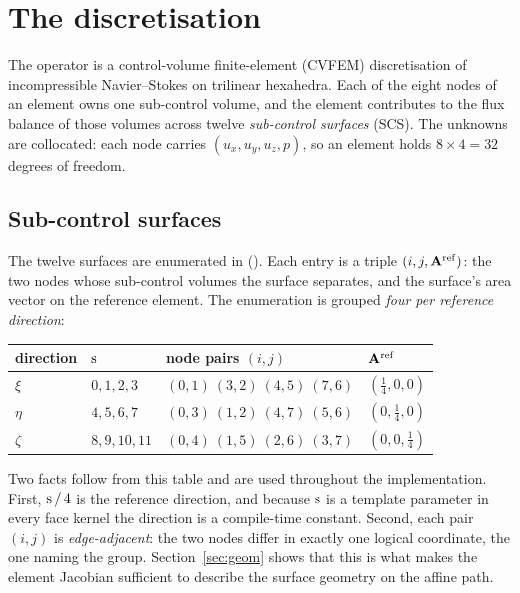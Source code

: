 \section{The discretisation}
\label{sec:disc}

The operator is a control-volume finite-element (CVFEM) discretisation of incompressible
Navier--Stokes on trilinear hexahedra. Each of the eight nodes of an element owns one
sub-control volume, and the element contributes to the flux balance of those volumes across
twelve \emph{sub-control surfaces} (SCS). The unknowns are collocated: each node carries
$(u_x,u_y,u_z,p)$, so an element holds $8\times 4 = 32$ degrees of freedom.

\subsection{Sub-control surfaces}

The twelve surfaces are enumerated in 
(). Each entry is a triple
$(i, j, \mathbf{A}^{\mathrm{ref}})$: the two nodes whose sub-control volumes the surface separates,
and the surface's area vector on the reference element. The enumeration is grouped
\emph{four per reference direction}:

\begin{center}
\begin{tabular}{@{}llll@{}}
\toprule
direction & $\mathrm{s}$ & node pairs $(i,j)$ & $\mathbf{A}^{\mathrm{ref}}$ \\
\midrule
$\xi$   & $0,1,2,3$    & $(0,1)\ (3,2)\ (4,5)\ (7,6)$ & $(\tfrac14,0,0)$ \\
$\eta$  & $4,5,6,7$    & $(0,3)\ (1,2)\ (4,7)\ (5,6)$ & $(0,\tfrac14,0)$ \\
$\zeta$ & $8,9,10,11$  & $(0,4)\ (1,5)\ (2,6)\ (3,7)$ & $(0,0,\tfrac14)$ \\
\bottomrule
\end{tabular}
\end{center}

Two facts follow from this table and are used throughout the implementation. First,
$\mathrm{s} \,/\, 4$ is the reference direction, and because $\mathrm{s}$ is a template parameter in every
face kernel the direction is a compile-time constant. Second, each pair $(i,j)$ is
\emph{edge-adjacent}: the two nodes differ in exactly one logical coordinate, the one naming the
group. Section~\ref{sec:geom} shows that this is what makes the element Jacobian sufficient to
describe the surface geometry on the affine path.


